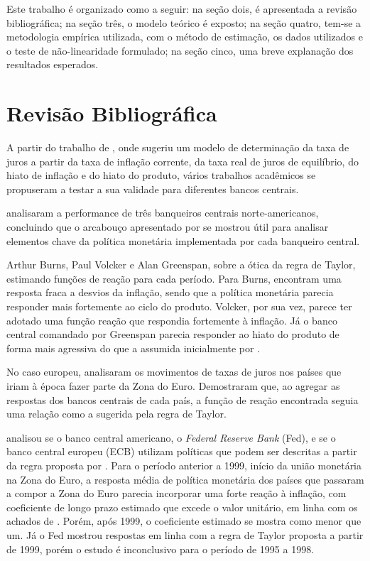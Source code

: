 \documentclass[
	article,			%
	11pt,				%
	oneside,			%
	a4paper,			%
	english,			%
	brazil,				%
	]{abntex2}
\begin{document}
	Este trabalho é organizado como a seguir: na seção dois, é apresentada a revisão bibliográfica; na seção três, o modelo teórico é exposto; na seção quatro, tem-se a metodologia empírica utilizada, com o método de estimação, os dados utilizados e o teste de não-linearidade formulado; na seção cinco, uma breve explanação dos resultados esperados.
	
	\section{Revisão Bibliográfica}
	
	A partir do trabalho de , onde sugeriu um modelo de determinação da taxa de juros a partir da taxa de inflação corrente, da taxa real de juros de equilíbrio, do hiato de inflação e do hiato do produto, vários trabalhos acadêmicos se propuseram a testar a sua validade para diferentes bancos centrais.
	
	 analisaram a performance de três banqueiros centrais norte-americanos, concluindo que o arcabouço apresentado por  se mostrou útil para analisar elementos chave da política monetária implementada por cada banqueiro central.
	
	Arthur Burns, Paul Volcker e Alan Greenspan, sobre a ótica da regra de Taylor, estimando funções de reação para cada período. Para Burns, encontram uma resposta fraca a desvios da inflação, sendo que a política monetária parecia responder mais fortemente ao ciclo do produto. Volcker, por sua vez, parece ter adotado uma função reação que respondia fortemente à inflação. Já o banco central comandado por Greenspan parecia responder ao hiato do produto de forma mais agressiva do que a assumida inicialmente por . 
	
	No caso europeu,  analisaram os movimentos de taxas de juros nos países que iriam à época fazer parte da Zona do Euro. Demostraram que, ao agregar as respostas dos bancos centrais de cada país, a função de reação encontrada seguia uma relação como a sugerida pela regra de Taylor.
	
	 analisou se o banco central americano, o \textit{Federal Reserve Bank} (Fed), e se o banco central europeu (ECB) utilizam políticas que podem ser descritas a partir da regra proposta por . Para o período anterior a 1999, início da união monetária na Zona do Euro, a resposta média de política monetária dos países que passaram a compor a Zona do Euro parecia incorporar uma forte reação à inflação, com coeficiente de longo prazo estimado que excede o valor unitário, em linha com os achados de . Porém, após 1999, o coeficiente estimado se mostra como menor que um. Já o Fed mostrou respostas em linha com a regra de Taylor proposta a partir de 1999, porém o estudo é inconclusivo para o período de 1995 a 1998.
	
\end{document}
